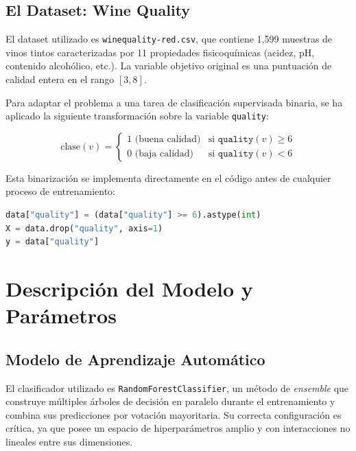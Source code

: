 \documentclass[12pt, a4paper]{article}
\begin{document}
\subsection{El Dataset: Wine Quality}

El dataset utilizado es \texttt{winequality-red.csv}, que contiene 1{,}599 muestras de
vinos tintos caracterizadas por 11 propiedades fisicoquímicas (acidez, pH, contenido
alcohólico, etc.). La variable objetivo original es una puntuación de calidad entera en
el rango $[3, 8]$.

Para adaptar el problema a una tarea de clasificación supervisada binaria, se ha aplicado
la siguiente transformación sobre la variable \texttt{quality}:

\begin{equation}
  \text{clase}(v) =
  \begin{cases}
    1 \text{ (buena calidad)} & \text{si } \texttt{quality}(v) \geq 6 \\
    0 \text{ (baja calidad)}  & \text{si } \texttt{quality}(v) < 6
  \end{cases}
\end{equation}

Esta binarización se implementa directamente en el código antes de cualquier proceso de
entrenamiento:

\begin{lstlisting}[language=Python, caption={Transformación binaria de la variable objetivo}]
data["quality"] = (data["quality"] >= 6).astype(int)
X = data.drop("quality", axis=1)
y = data["quality"]
\end{lstlisting}

\section{Descripción del Modelo y Parámetros}

\subsection{Modelo de Aprendizaje Automático}

El clasificador utilizado es \texttt{RandomForestClassifier}, un método de
\textit{ensemble} que construye múltiples árboles de decisión en paralelo durante el
entrenamiento y combina sus predicciones por votación mayoritaria. Su correcta
configuración es crítica, ya que posee un espacio de hiperparámetros amplio y con
interacciones no lineales entre sus dimensiones.
\end{document}
